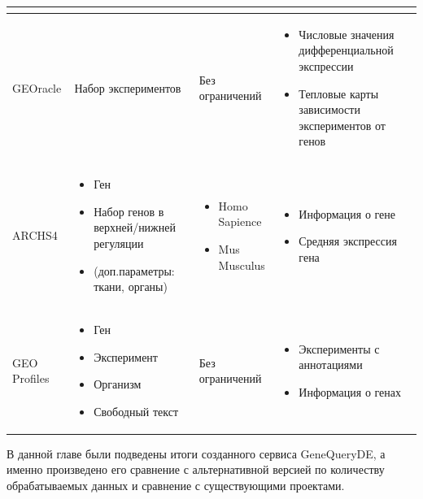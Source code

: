 \documentclass[times,specification,annotation]{itmo-student-thesis}
\begin{document}
\begin{table}
\begin{tabu}{ |X[l]|m{6.7cm}|m{6.7cm}|m{6.7cm}|}
\begin{itemize}
        \end{itemize}\\ 
        \hline 
         GEOracle & Набор экспериментов & Без ограничений & \begin{itemize}
            \item Числовые значения дифференциальной экспрессии
            \item Тепловые карты зависимости экспериментов от генов
        \end{itemize}\\ 
        \hline
         ARCHS4 & \begin{itemize}
            \item Ген
            \item Набор генов в верхней/нижней регуляции
            \item (доп.параметры: ткани, органы)
        \end{itemize} & \begin{itemize}
            \item Homo Sapience
            \item Mus Musculus
        \end{itemize} & \begin{itemize}
            \item Информация о гене
            \item Средняя экспрессия гена
        \end{itemize}\\ 
        \hline
         GEO Profiles & \begin{itemize}
            \item Ген
            \item Эксперимент
            \item Организм
            \item Свободный текст
        \end{itemize} & Без ограничений & \begin{itemize}
            \item Эксперименты с аннотациями
            \item Информация о генах
        \end{itemize}\\ 
        \hline
    \end{tabu}
\end{table}

\chapterconclusion

В данной главе были подведены итоги созданного сервиса GeneQueryDE, а именно произведено его сравнение с альтернативной версией по количеству обрабатываемых данных и сравнение с существующими проектами. 
  
\end{document}
